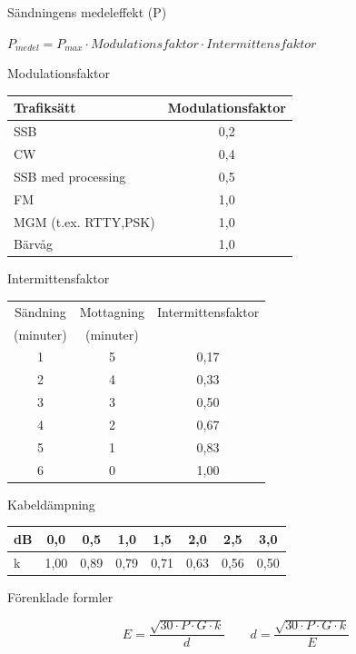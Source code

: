 \documentclass{beamer}
\begin{document}
\begin{frame}{Sändningens medeleffekt (P)}

\(P_{medel} = P_{max} \cdot Modulationsfaktor \cdot Intermittensfaktor\)
\end{frame}

\begin{frame}{Modulationsfaktor}
\begin{tabular}{|l|c|}
	\hline
	Trafiksätt & Modulationsfaktor \\ \hline
	SSB & 0,2 \\ \hline
	CW & 0,4 \\ \hline
	SSB med processing & 0,5 \\ \hline
	FM & 1,0 \\ \hline
	MGM (t.ex. RTTY,PSK) & 1,0 \\ \hline
	Bärvåg & 1,0 \\ \hline
\end{tabular}
\end{frame}

\begin{frame}{Intermittensfaktor}
\begin{tabular}{|c|c|c|}
	\hline
	Sändning  & Mottagning & Intermittensfaktor \\
	(minuter) & (minuter)  & \\ \hline
	1 & 5 & 0,17 \\ \hline
	2 & 4 & 0,33 \\ \hline
	3 & 3 & 0,50 \\ \hline
	4 & 2 & 0,67 \\ \hline
	5 & 1 & 0,83 \\ \hline
	6 & 0 & 1,00 \\ \hline
\end{tabular}
\end{frame}

\begin{frame}{Kabeldämpning}
\begin{tabular}{|l|c|c|c|c|c|c|c|}
	\hline
	dB & 0,0  & 0,5  & 1,0  & 1,5  & 2,0  & 2,5  & 3,0 \\ \hline
	k  & 1,00 & 0,89 & 0,79 & 0,71 & 0,63 & 0,56 & 0,50 \\ \hline
\end{tabular}
\end{frame}

\begin{frame}{Förenklade formler}

\[ E=\dfrac{\sqrt{30 \cdot P \cdot G \cdot k}}{d}\qquad d=\dfrac{\sqrt{30 \cdot P \cdot G \cdot k}}{E}\]
\end{frame}
\end{document}
